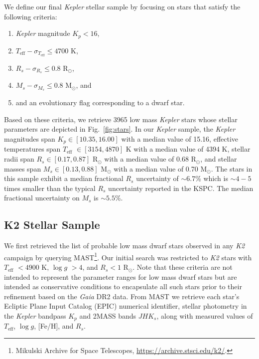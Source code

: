 \documentclass[twocolumn]{emulateapj}
\newcommand{\gaia}[1]{\emph{Gaia}#1}
\newcommand{\kepler}[1]{\emph{Kepler}#1}
\newcommand{\ktwo}[1]{\emph{K2}#1}
\newcommand{\teff}[1]{$T_{\text{eff}}$#1}
\newcommand{\logg}[1]{$\log{g}$#1}
\begin{document}
We define our final \kepler{} stellar sample by focusing on stars that satisfy the following
criteria:

\begin{enumerate}
\item \kepler{} magnitude $K_p < 16$,
\item $T_{\text{eff}} - \sigma_{T_{\text{eff}}} \leq 4700$ K,
\item $R_s - \sigma_{R_s} \leq 0.8$ R$_{\odot}$,
\item $M_s - \sigma_{M_s} \leq 0.8$ M$_{\odot}$, and
\item and an evolutionary flag corresponding to a dwarf star. 
\end{enumerate}

\noindent Based on these criteria, we retrieve 3965 low mass \kepler{} stars whose
stellar parameters are depicted in Fig.~\ref{fig:stars}.
In our \kepler{} sample, the \kepler{} magnitudes span $K_p \in [10.35, 16.00]$ with a median value of 15.16,
effective temperatures span \teff{} $\in [3154, 4870]$ K with a median value of 4394 K,
stellar radii span $R_s \in [0.17, 0.87]$ R$_{\odot}$ with a median value of 0.68 R$_{\odot}$, and
stellar masses span $M_s \in [0.13, 0.88]$ M$_{\odot}$ with a median value of 0.70 M$_{\odot}$.
The stars in this sample exhibit a median fractional $R_s$ uncertainty of $\sim 6.7$\% which is $\sim 4-5$
times smaller than the typical $R_s$ uncertainty reported in the KSPC. The median fractional uncertainty on
$M_s$ is $\sim 5.5$\%.

\subsection{K2 Stellar Sample}
We first retrieved the list of probable low mass dwarf stars observed in any \ktwo{} campaign by querying
MAST\footnote{Mikulski Archive for Space Telescopes, \url{https://archive.stsci.edu/k2/}.}. Our initial
search was restricted to \ktwo{} stars with \teff{} $<4900$ K, \logg{} $>4$, and $R_s<1$ R$_{\odot}$. Note that these
criteria are not intended to represent the parameter ranges for low mass dwarf stars but are intended as
conservative conditions to encapsulate all such stars prior to their refinement based on the \gaia{} DR2
data. %
From MAST we retrieve each star's Ecliptic Plane Input Catalog
(EPIC) numerical identifier, stellar photometry in the \kepler{} bandpass $K_p$ and 2MASS bands $JHK_s$, along
with measured values of \teff{,} \logg{,} [Fe/H], and $R_s$.%
\end{document}
